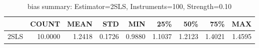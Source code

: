 \begin{table}[ht]
\centering
\caption{bias summary: Estimator=2SLS, Instruments=100, Strength=0.10}
\begin{tabular}{lrrrrrrrr}
\toprule
 & COUNT & MEAN & STD & MIN & 25\% & 50\% & 75\% & MAX \\
\midrule
2SLS & 10.0000 & 1.2418 & 0.1726 & 0.9880 & 1.1037 & 1.2123 & 1.4021 & 1.4595 \\
\bottomrule
\end{tabular}
\end{table}
